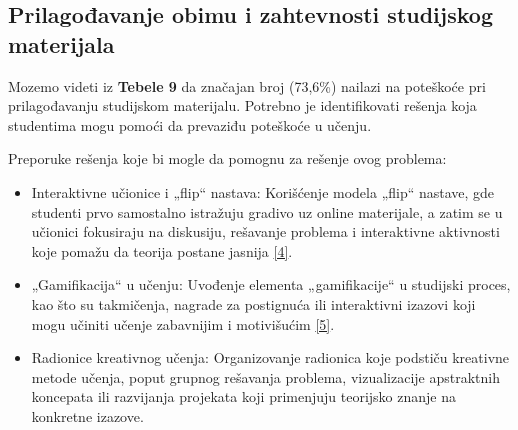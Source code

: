 \documentclass[a4paper]{article}
\begin{document}
\newpage

\subsection{\textbf{Prilagođavanje obimu i zahtevnosti studijskog materijala}}

Mozemo videti iz \textbf{Tebele 9} da značajan broj (73,6\%) nailazi na poteškoće pri prilagođavanju studijskom materijalu. Potrebno je identifikovati rešenja koja studentima mogu pomoći da prevaziđu poteškoće u učenju.\\

\begin{table}[H]
\centering %
\caption{Prilagođavanje obimu i zahtevnosti studijskog materijala}
\end{table}

Preporuke rešenja koje bi mogle da pomognu za rešenje ovog problema:\\

\begin{itemize}
    \item Interaktivne učionice i „flip“ nastava: Korišćenje modela „flip“ nastave, gde studenti prvo samostalno istražuju gradivo uz online materijale, a zatim se u učionici fokusiraju na diskusiju, rešavanje problema i interaktivne aktivnosti koje pomažu da teorija postane jasnija  \href{ https://doi.org/10.1162/edfp_a_00314}{[4]}.
    \item „Gamifikacija“ u učenju: Uvođenje elementa „gamifikacije“ u studijski proces, kao što su takmičenja, nagrade za postignuća ili interaktivni izazovi koji mogu učiniti učenje zabavnijim i motivišućim \href{  https://doi.org/10.3390/educsci14060639}{[5]}. 
    \item Radionice kreativnog učenja: Organizovanje radionica koje podstiču kreativne metode učenja, poput grupnog rešavanja problema, vizualizacije apstraktnih koncepata ili razvijanja projekata koji primenjuju teorijsko znanje na konkretne izazove.\\
\end{itemize}
\end{document}
